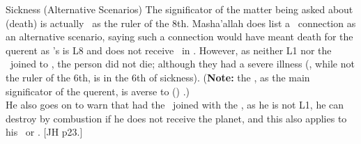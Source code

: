 \begin{frame}[t]{Sickness (Alternative Scenarios)}
The significator of the matter being asked about (death) is actually \Mars\ as the ruler of the 8th. Masha'allah does list a \Mars\ connection as an alternative scenario, saying such a connection would have meant death for the querent as \Mars's is L8 and does not receive \Venus\ in \Pisces. However, as neither L1 nor the \Moon\ joined to \Mars, the person did not die; although they had a severe illness (\Venus, while not the ruler of the 6th, is in the 6th of sickness). (\textbf{Note:} the \Moon, as the main significator of the querent, is averse to (\Semisextile) \Mars.)\\

\vspace{0.2cm}
He also goes on to warn that had the \Moon\ joined with the \Sun, as he is not L1, he can destroy by combustion if he does not receive the planet, and this also applies to his \Square\ or \Opposition. [JH p23.]\footnotemark[1]

\end{frame}